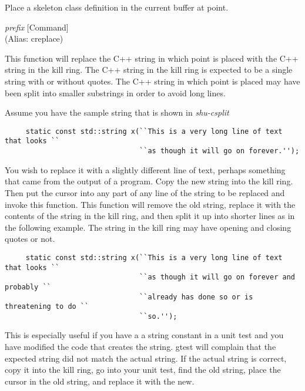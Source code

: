 \begin{doc-string}
Place a skeleton class definition in the current buffer at point.
\end{doc-string}

\vspace{1em}
\noindent
{}
\usebox{\funcname}\emph{prefix}
 \hfill [Command]\\%
 (Alias: creplace)

\begin{doc-string}
This function will replace the C++ string in which point is placed with the
C++ string in the kill ring.  The C++ string in the kill ring is expected to be
a single string with or without quotes.  The C++ string in which point is placed
may have been split into smaller substrings in order to avoid long lines.

Assume you have the sample string that is shown in \emph{shu-csplit}

\small{\begin{verbatim}
     static const std::string x(``This is a very long line of text that looks ``
                                ``as though it will go on forever.'');
\end{verbatim}}

You wish to replace it with a slightly different line of text, perhaps something
that came from the output of a program.  Copy the new string into the kill ring.
Then put the cursor into any part of any line of the string to be replaced
and invoke this function.  This function will remove the old string, replace it
with the contents of the string in the kill ring, and then split it up into
shorter lines as in the following example.  The string in the kill ring may have
opening and closing quotes or not.

\small{\begin{verbatim}
     static const std::string x(``This is a very long line of text that looks ``
                                ``as though it will go on forever and probably ``
                                ``already has done so or is threatening to do ``
                                ``so.'');
\end{verbatim}}

This is especially useful if you have a a string constant in a unit test and you
have modified the code that creates the string.  gtest will complain that the
expected string did not match the actual string.  If the actual string is
correct, copy it into the kill ring, go into your unit test, find the old
string, place the cursor in the old string, and replace it with the new.
\end{doc-string}

